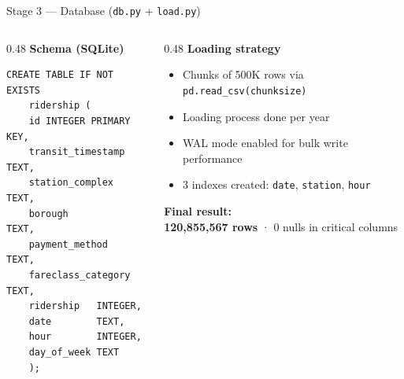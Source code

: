 \documentclass{beamer}
\begin{document}
	\begin{frame}[fragile]{Stage 3 — Database (\texttt{db.py} + \texttt{load.py})}
		\begin{columns}[T]
			\begin{column}{0.48\textwidth}
				\textcolor{accentBlue}{\textbf{Schema (SQLite)}}
				\begin{block}{}
					\begin{lstlisting}[style=sqlsmall]
CREATE TABLE IF NOT EXISTS
	ridership (
	id INTEGER PRIMARY KEY,
	transit_timestamp TEXT,
	station_complex   TEXT,
	borough           TEXT,
	payment_method    TEXT,
	fareclass_category TEXT,
	ridership   INTEGER,
	date        TEXT,
	hour        INTEGER,
	day_of_week TEXT
	);
					\end{lstlisting}
				\end{block}
			\end{column}
			\begin{column}{0.48\textwidth}
				\textcolor{accentBlue}{\textbf{Loading strategy}}
				\begin{itemize}
					\item Chunks of 500K rows via \texttt{pd.read\_csv(chunksize)}
					\item Loading process done per year
					\item WAL mode enabled for bulk write performance
					\item 3 indexes created: \texttt{date}, \texttt{station}, \texttt{hour}
				\end{itemize}
				\vspace{0.3cm}
				\textcolor{mtaGreen}{\textbf{Final result:}}\\
				\textbf{120,855,567 rows} · 0 nulls in critical columns
			\end{column}
		\end{columns}
	\end{frame}
	
\end{document}

